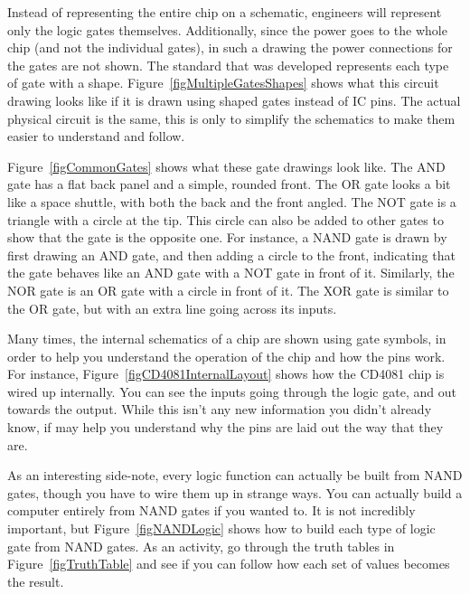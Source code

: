 
Instead of representing the entire chip on a schematic, engineers will represent only the logic gates themselves.
Additionally, since the power goes to the whole chip (and not the individual gates), in such a drawing the power connections for the gates are not shown.
The standard that was developed represents each type of gate with a shape.
Figure~\ref{figMultipleGatesShapes} shows what this circuit drawing looks like if it is drawn using shaped gates instead of IC pins.
The actual physical circuit is the same, this is only to simplify the schematics to make them easier to understand and follow.


Figure~\ref{figCommonGates} shows what these gate drawings look like.
The AND gate has a flat back panel and a simple, rounded front.
The OR gate looks a bit like a space shuttle, with both the back and the front angled.
The NOT gate is a triangle with a circle at the tip.
This circle can also be added to other gates to show that the gate is the opposite one.
For instance, a NAND gate is drawn by first drawing an AND gate, and then adding a circle to the front, indicating that the gate behaves like an AND gate with a NOT gate in front of it.
Similarly, the NOR gate is an OR gate with a circle in front of it.
The XOR gate is similar to the OR gate, but with an extra line going across its inputs.

Many times, the internal schematics of a chip are shown using gate symbols, in order to help you understand the operation of the chip and how the pins work.
For instance, Figure~\ref{figCD4081InternalLayout} shows how the CD4081 chip is wired up internally.
You can see the inputs going through the logic gate, and out towards the output.
While this isn't any new information you didn't already know, if may help you understand why the pins are laid out the way that they are.


As an interesting side-note, every logic function can actually be built from NAND gates, though you have to wire them up in strange ways.
You can actually build a computer entirely from NAND gates if you wanted to.
It is not incredibly important, but Figure~\ref{figNANDLogic} shows how to build each type of logic gate from NAND gates.
As an activity, go through the truth tables in Figure~\ref{figTruthTable} and see if you can follow how each set of values becomes the result.

